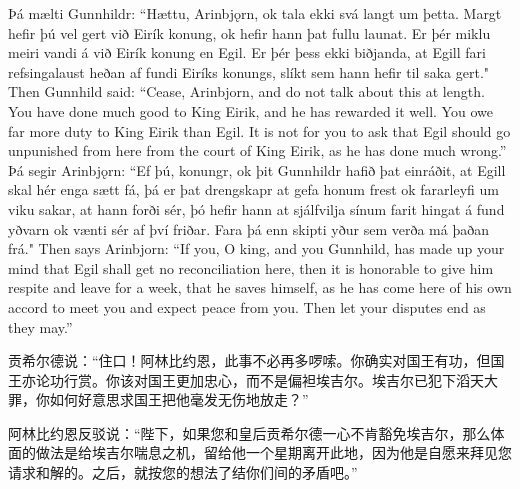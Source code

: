 \begin{paracol}{2}
  Þá mælti Gunnhildr: ``Hættu, Arinbjǫrn, ok tala ekki svá langt um þetta. Margt hefir þú vel gert við Eirík konung, ok hefir hann þat fullu launat. Er þér miklu meiri vandi á við Eirík konung en Egil. Er þér þess ekki biðjanda, at Egill fari refsingalaust heðan af fundi Eiríks konungs, slíkt sem hann hefir til saka gert."
  \switchcolumn
  Then Gunnhild said: ``Cease, Arinbjorn, and do not talk about this at length. You have done much good to King Eirik, and he has rewarded it well. You owe far more duty to King Eirik than Egil. It is not for you to ask that Egil should go unpunished from here from the court of King Eirik, as he has done much wrong.''
  \switchcolumn*
  Þá segir Arinbjǫrn: ``Ef þú, konungr, ok þit Gunnhildr hafið þat einráðit, at Egill skal hér enga sætt fá, þá er þat drengskapr at gefa honum frest ok fararleyfi um viku sakar, at hann forði sér, þó hefir hann at sjálfvilja sínum farit hingat á fund yðvarn ok vænti sér af því friðar. Fara þá enn skipti yður sem verða má þaðan frá."
  \switchcolumn
  Then says Arinbjorn: ``If you, O king, and you Gunnhild, has made up your mind that Egil shall get no reconciliation here, then it is honorable to give him respite and leave for a week, that he saves himself, as he has come here of his own accord to meet you and expect peace from you. Then let your disputes end as they may.''
\end{paracol}
\begin{translation*}{}
  贡希尔德说：“住口！阿林比约恩，此事不必再多啰嗦。你确实对国王有功，但国王亦论功行赏。你该对国王更加忠心，而不是偏袒埃吉尔。埃吉尔已犯下滔天大罪，你如何好意思求国王把他毫发无伤地放走？”

  阿林比约恩反驳说：“陛下，如果您和皇后贡希尔德一心不肯豁免埃吉尔，那么体面的做法是给埃吉尔喘息之机，留给他一个星期离开此地，因为他是自愿来拜见您请求和解的。之后，就按您的想法了结你们间的矛盾吧。”
\end{translation*}
